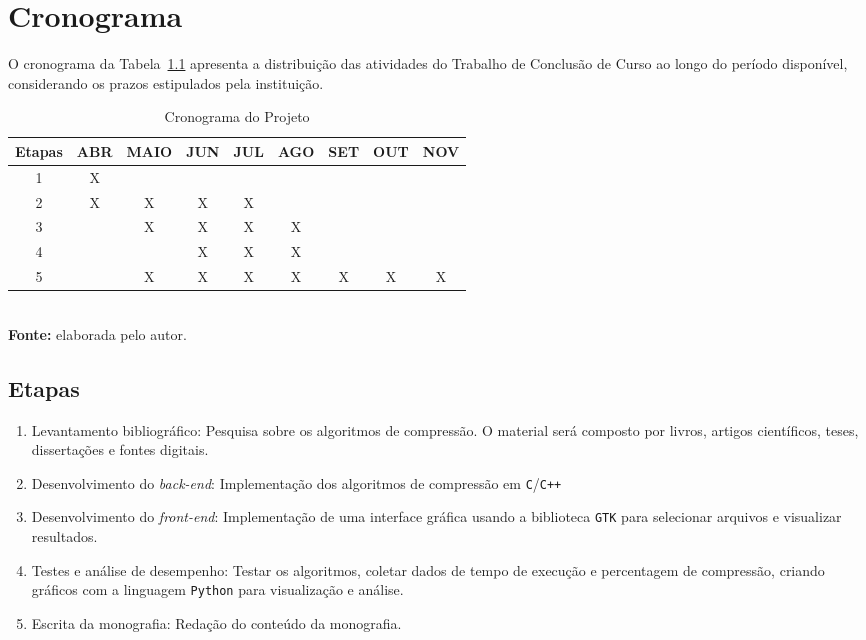 \chapter{Cronograma}
\label{c.cronograma}

O cronograma da Tabela~\ref{tab:cronograma} apresenta a distribuição das atividades do Trabalho de Conclusão de Curso ao longo do período disponível, considerando os prazos estipulados pela instituição.

\begin{table}[htb]
    \centering
    \renewcommand{\arraystretch}{1.3}
    \caption{Cronograma do Projeto} %
    \begin{tabular}{|c|c|c|c|c|c|c|c|c|}
        \hline
        \textbf{Etapas} & \textbf{ABR} & \textbf{MAIO} & \textbf{JUN} & \textbf{JUL} & \textbf{AGO} & \textbf{SET} & \textbf{OUT} & \textbf{NOV} \\
        \hline
        1 & X &   &   &   &   &   &   &   \\
        \hline
        2 & X & X & X & X &   &   &   &   \\
        \hline
        3 &   & X & X & X & X &   &   &   \\
        \hline
        4 &   &   & X & X & X &   &   &   \\
        \hline
	5 &   & X & X & X & X & X & X & X \\
	\hline
    \end{tabular}
    \vspace{2mm} \\ %
    \textbf{Fonte:} elaborada pelo autor. %
    \label{tab:cronograma} %
\end{table}

\section*{Etapas}
\begin{enumerate}
    \item Levantamento bibliográfico: Pesquisa sobre os algoritmos de compressão. O material será composto por livros, artigos científicos, teses, dissertações e fontes digitais. 
    \item Desenvolvimento do \textit{back-end}: Implementação dos algoritmos de compressão em \texttt{C}/\texttt{C++}
    \item Desenvolvimento do \textit{front-end}: Implementação de uma interface gráfica usando a biblioteca \texttt{GTK} para selecionar arquivos e visualizar resultados.
    \item Testes e análise de desempenho: Testar os algoritmos, coletar dados de tempo de execução e percentagem de compressão, criando gráficos com a linguagem \texttt{Python} para visualização e análise.
    \item Escrita da monografia: Redação do conteúdo da monografia.
\end{enumerate}
